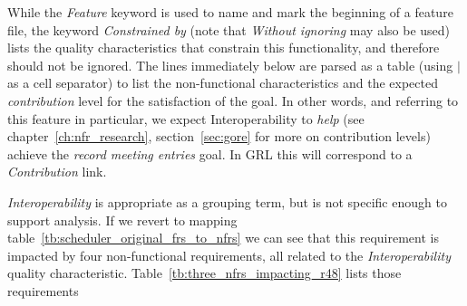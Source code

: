 \documentclass[dissertation,final]{softeng}
\newcommand{\nfrs}{non-functional requirements\xspace}
\begin{document}
While the \emph{Feature} keyword is used to name and mark the beginning of a feature file, the keyword \emph{Constrained by} (note that \emph{Without ignoring} may also be used) lists the quality characteristics that constrain this functionality, and therefore should not be ignored. The lines immediately below are parsed as a table (using $\vert$ as a cell separator) to list the non-functional characteristics and the expected \emph{contribution} level for the satisfaction of the goal. In other words, and referring to this feature in particular, we expect Interoperability to \emph{help} (see chapter~\ref{ch:nfr_research}, section~\ref{sec:gore} for more on contribution levels) achieve the \emph{record meeting entries} goal. In GRL this will correspond to a \emph{Contribution} link.

\emph{Interoperability} is appropriate as a grouping term, but is not specific enough to support analysis. If we revert to mapping table~\ref{tb:scheduler_original_frs_to_nfrs} we can see that this requirement is impacted by four \nfrs, all related to the \emph{Interoperability} quality characteristic. Table~\ref{tb:three_nfrs_impacting_r48} lists those requirements

\captionsetup[table]{list=no}
\begin{table}[h!]
\caption{Four \nfrs impacting functional requirement 48}
\label{tb:three_nfrs_impacting_r48}
\setlength{\extrarowheight}{1.8pt}
\centering
{}
\end{table}
\captionsetup[table]{list=yes}
\end{document}
